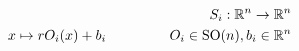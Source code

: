 \documentclass[preview]{standalone}
\begin{document}
\begin{align*}
S_i : \mathbb{R}^n \to \mathbb{R}^n \\ x \mapsto r O_i(x) + b_i \;\hspace{1.5 cm} O_i \in \text{SO}(n), b_i \in \mathbb{R}^n \\
\end{align*}
\end{document}
